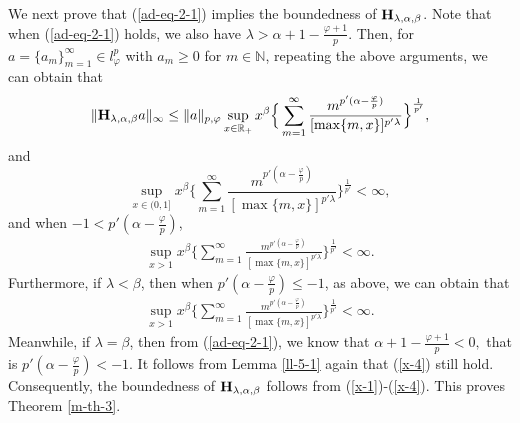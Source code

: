 \documentclass[10pt]{amsart}
\theoremstyle{definition}    %
\numberwithin{equation}{section}
\begin{document}
We next prove that  (\ref{ad-eq-2-1}) implies the boundedness of ${\bf H}_{\lambda, \alpha, \beta}$. Note that when (\ref{ad-eq-2-1}) holds, we also have  $\lambda>\alpha+1-\frac{\varphi+1}{p}$. Then, for $a=\{a_m\}_{m=1}^{\infty}\in l_{\varphi}^p$ with $a_m\geq 0$ for $m\in \mathbb{N}$, repeating the above arguments, we can obtain that 
\begin{eqnarray}\label{x-1}
\|{\bf H}_{\lambda, \alpha, \beta}a\|_{\infty}\leq \|a\|_{p, \varphi}\sup_{x\in \mathbb{R}_{+}}x^{\beta}\Big\{\sum_{m=1}^{\infty}\frac{m^{p'(\alpha-\frac{\varphi}{p})}}{[\max\{m,x\}]^{p'\lambda}}\Big\}^{\frac{1}{p'}}, 
\end{eqnarray}
and
\begin{equation}\label{x-2}
\sup_{x\in (0,1]}x^{\beta}\Big\{\sum_{m=1}^{\infty}\frac{m^{p'(\alpha-\frac{\varphi}{p})}}{[\max\{m,x\}]^{p'\lambda}}\Big\}^{\frac{1}{p'}}<\infty, 
\end{equation}
and when $-1<p'(\alpha-\frac{\varphi}{p})$, 
\begin{eqnarray}\label{x-3}
\sup_{x>1}x^{\beta}\Big\{\sum_{m=1}^{\infty}\frac{m^{p'(\alpha-\frac{\varphi}{p})}}{[\max\{m,x\}]^{p'\lambda}}\Big\}^{\frac{1}{p'}}<\infty. 
\end{eqnarray}
Furthermore, if $\lambda<\beta$, then when $p'(\alpha-\frac{\varphi}{p})\leq -1$, as above, we can obtain that 
 \begin{eqnarray}\label{x-4}
\sup_{x>1}x^{\beta}\Big\{\sum_{m=1}^{\infty}\frac{m^{p'(\alpha-\frac{\varphi}{p})}}{[\max\{m,x\}]^{p'\lambda}}\Big\}^{\frac{1}{p'}}<\infty. 
\end{eqnarray}
Meanwhile, if $\lambda=\beta$, then from (\ref{ad-eq-2-1}), we know that $\alpha+1-\frac{\varphi+1}{p}<0,$ that is $p'(\alpha-\frac{\varphi}{p})<-1$. It follows from Lemma \ref{ll-5-1} again that (\ref{x-4}) still hold. 
Consequently, the boundedness of ${\bf H}_{\lambda, \alpha, \beta}$ follows from (\ref{x-1})-(\ref{x-4}). This proves Theorem \ref{m-th-3}. 
\end{document}
